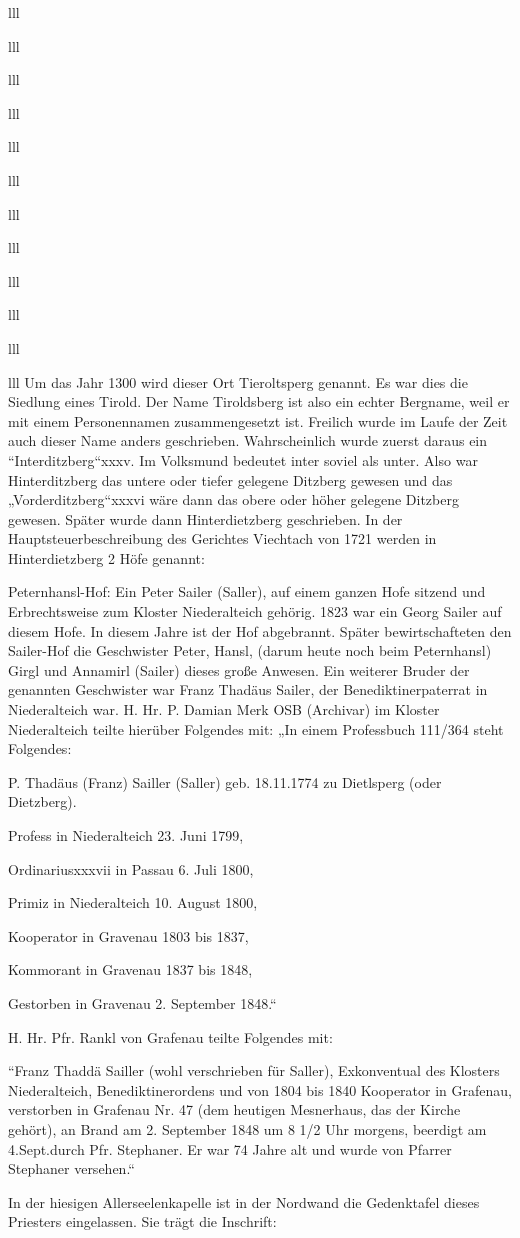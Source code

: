 \documentclass[12pt,a4pager]{book}
\begin{document}
\begin{tabuluar}{lll}
\begin{tabuluar}{lll}
\begin{tabuluar}{lll}
\begin{tabuluar}{lll}
\begin{tabuluar}{lll}
\begin{tabuluar}{lll}
\begin{tabuluar}{lll}
\begin{tabuluar}{lll}
\begin{tabuluar}{lll}
\begin{tabuluar}{lll}
\begin{tabuluar}{lll}
\begin{tabuluar}{lll}
Um das Jahr 1300 wird dieser Ort Tieroltsperg genannt. Es war dies die Siedlung
eines Tirold. Der Name Tiroldsberg ist also ein echter Bergname, weil er mit
einem Personennamen zusammengesetzt ist. Freilich wurde im Laufe der Zeit auch
dieser Name anders geschrieben. Wahrscheinlich wurde zuerst daraus ein
“Interditzberg“xxxv. Im Volksmund bedeutet inter soviel als unter. Also war
Hinterditzberg das untere oder tiefer gelegene Ditzberg gewesen und das
„Vorderditzberg“xxxvi wäre dann das obere oder höher gelegene Ditzberg gewesen.
Später wurde dann Hinterdietzberg geschrieben. In der Hauptsteuerbeschreibung
des Gerichtes Viechtach von 1721 werden in Hinterdietzberg 2 Höfe genannt:

Peternhansl-Hof: Ein Peter Sailer (Saller), auf einem ganzen Hofe sitzend und
Erbrechtsweise zum Kloster Niederalteich gehörig. 1823 war ein Georg Sailer auf
diesem Hofe. In diesem Jahre ist der Hof abgebrannt. Später bewirtschafteten den
Sailer-Hof die Geschwister Peter, Hansl, (darum heute noch beim Peternhansl)
Girgl und Annamirl (Sailer) dieses große Anwesen. Ein weiterer Bruder der
genannten Geschwister war Franz Thadäus Sailer, der Benediktinerpaterrat in
Niederalteich war. H. Hr. P. Damian Merk OSB (Archivar) im Kloster Niederalteich
teilte hierüber Folgendes mit: „In einem Professbuch 111/364 steht Folgendes:

P. Thadäus (Franz) Sailler (Saller) geb. 18.11.1774 zu Dietlsperg (oder
Dietzberg).

Profess in Niederalteich 23. Juni 1799,

Ordinariusxxxvii in  Passau 6. Juli 1800,

Primiz in Niederalteich 10. August 1800,

Kooperator in Gravenau 1803 bis 1837,

Kommorant in Gravenau 1837 bis 1848,

Gestorben in Gravenau 2. September 1848.“

H. Hr. Pfr. Rankl von Grafenau teilte Folgendes mit:

“Franz Thaddä Sailler (wohl verschrieben für Saller), Exkonventual des Klosters
Niederalteich, Benediktinerordens und von 1804 bis 1840 Kooperator in Grafenau,
verstorben in Grafenau Nr. 47 (dem heutigen Mesnerhaus, das der Kirche gehört),
an Brand am 2. September 1848 um 8 1/2 Uhr morgens, beerdigt am 4.Sept.durch Pfr.
Stephaner. Er war 74 Jahre alt und wurde von Pfarrer Stephaner versehen.“

In der hiesigen Allerseelenkapelle ist in der Nordwand die Gedenktafel dieses
Priesters eingelassen. Sie trägt die Inschrift:


\end{tabuluar}
\end{tabuluar}
\end{tabuluar}
\end{tabuluar}
\end{tabuluar}
\end{tabuluar}
\end{tabuluar}
\end{tabuluar}
\end{tabuluar}
\end{tabuluar}
\end{tabuluar}
\end{tabuluar}
\end{document}
